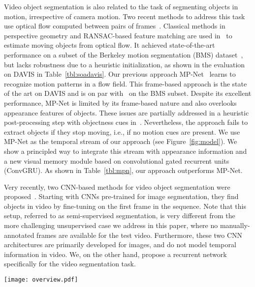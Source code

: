 \documentclass[10pt,twocolumn,letterpaper]{article}
\begin{document}
Video object segmentation is also related to the task of segmenting objects in
motion, irrespective of camera motion. Two recent methods to address this task
use optical flow computed between pairs of
frames~\cite{Bideau16,tokmakov2016learning}. Classical methods in perspective
geometry and RANSAC-based feature matching are used in~\cite{Bideau16} to
estimate moving objects from optical flow. It achieved state-of-the-art
performance on a subset of the Berkeley motion segmentation (BMS)
dataset~\cite{brox2010object}, but lacks robustness due to a heuristic
initialization, as shown in the evaluation on DAVIS in
Table~\ref{tbl:soadavis}. Our previous approach
MP-Net~\cite{tokmakov2016learning} learns to recognize motion patterns in a
flow field. This frame-based approach is the state of the art on DAVIS and is
on par with~\cite{Bideau16} on the BMS subset.  Despite its excellent
performance, MP-Net is limited by its frame-based nature and also overlooks
appearance features of objects. These issues are partially addressed in a
heuristic post-processing step with objectness cues
in~\cite{tokmakov2016learning}. Nevertheless, the approach fails to extract
objects if they stop moving, i.e., if no motion cues are present. We use MP-Net
as the temporal stream of our  approach (see Figure~\ref{fig:model}). We show a
principled way to integrate this stream with appearance information and a new
visual memory module based on convolutional gated recurrent units (ConvGRU). As
shown in Table~\ref{tbl:mpn}, our approach outperforms MP-Net. 

Very recently, two CNN-based methods for video object segmentation were
proposed~\cite{Khoreva16,Caelles17}. Starting with CNNs pre-trained for image
segmentation, they find objects in video by fine-tuning on the first frame in
the sequence. Note that this setup, referred to as semi-supervised
segmentation, is very different from the more challenging unsupervised case we
address in this paper, where no manually-annotated frames are available for the
test video. Furthermore, these two CNN architectures are primarily developed
for images, and do not model temporal information in video. We, on the other
hand, propose a recurrent network specifically for the video segmentation task.

\begin{figure*}[th]
\begin{center}
\texttt{[image: overview.pdf]}
\end{center}
\vspace{-0.3cm}
\caption{Overview of our segmentation approach. Each video frame is processed
by the appearance (green) and the motion (yellow) networks to produce an
intermediate two-stream representation. The ConvGRU module combines this with
the learned visual memory to compute the final segmentation result. The width
(w') and height (h') of the feature map and the output are $\text{w}/8$ and
$\text{h}/8$ respectively.}
\vspace{-0.3cm}
\label{fig:model}
\end{figure*}
\end{document}
